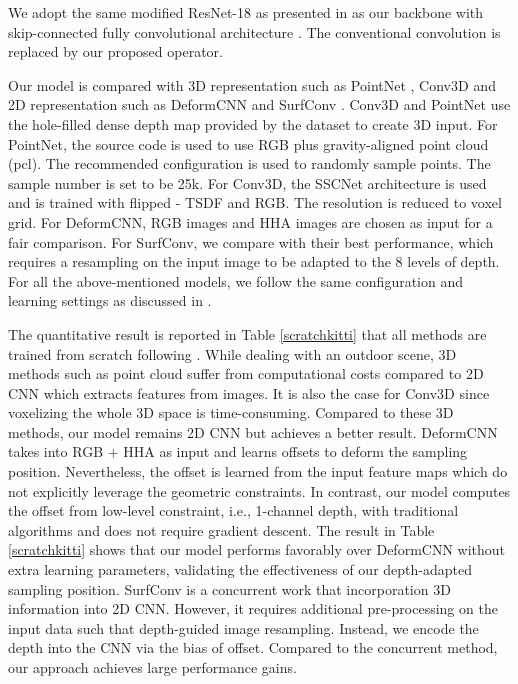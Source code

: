 \documentclass[lettersize,journal]{IEEEtran}
\begin{document}
We adopt the same modified ResNet-18 as presented in \cite{chu2018surfconv} as our backbone with skip-connected fully convolutional architecture \cite{Long2015FCN}. The conventional convolution is replaced by our proposed operator. 

Our model is compared with 3D representation such as PointNet \cite{Qi2017pointnet}, Conv3D \cite{tchapmi2017segcloud,song2017semantic} and 2D representation such as DeformCNN \cite{dai2017deformable} and SurfConv \cite{chu2018surfconv}. Conv3D \cite{tchapmi2017segcloud,song2017semantic} and PointNet \cite{Qi2017pointnet} use the hole-filled dense depth map provided by the dataset to create 3D input. For PointNet, the source code is used to use RGB plus gravity-aligned point cloud (pcl). The recommended configuration \cite{Qi2017pointnet} is used to randomly sample points. The sample number is set to be 25k. For Conv3D, the SSCNet architecture \cite{tchapmi2017segcloud} is used and is trained with flipped - TSDF and RGB. The resolution is reduced to  voxel grid. For DeformCNN, RGB images and HHA images are chosen as input for a fair comparison.  For SurfConv, we compare with their best performance, which requires a resampling on the input image to be adapted to the 8 levels of depth. For all the above-mentioned models, we follow the same configuration and learning settings as discussed in \cite{chu2018surfconv}.

The quantitative result is reported in Table \ref{scratchkitti} that all methods are trained from scratch following \cite{chu2018surfconv}. While dealing with an outdoor scene, 3D methods such as point cloud suffer from computational costs compared to 2D CNN which extracts features from images. It is also the case for Conv3D \cite{tchapmi2017segcloud,song2017semantic} since voxelizing the whole 3D space is time-consuming. Compared to these 3D methods, our model remains 2D CNN but achieves a better result. DeformCNN \cite{dai2017deformable} takes into RGB + HHA as input and learns offsets to deform the sampling position. Nevertheless, the offset is learned from the input feature maps which do not explicitly leverage the geometric constraints. In contrast, our model computes the offset from low-level constraint, i.e., 1-channel depth, with traditional algorithms and does not require gradient descent. The result in Table \ref{scratchkitti} shows that our model performs favorably over DeformCNN without extra learning parameters, validating the effectiveness of our depth-adapted sampling position. SurfConv is a concurrent work that incorporation 3D information into 2D CNN. However, it requires additional pre-processing on the input data such that depth-guided image resampling. Instead, we encode the depth into the CNN via the bias of offset. Compared to the concurrent method, our approach achieves large performance gains.
\end{document}
